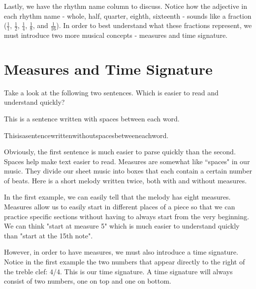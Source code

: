Lastly, we have the rhythm name column to discuss. Notice how the adjective in each rhythm name - whole, half, quarter, eighth, sixteenth - sounds like a fraction ($\frac{1}{1}$, $\frac{1}{2}$, $\frac{1}{4}$, $\frac{1}{8}$, and $\frac{1}{16}$). In order to best understand what these fractions represent, we must introduce two more musical concepts - measures and time signature.

\section{Measures and Time Signature}

Take a look at the following two sentences. Which is easier to read and understand quickly?

\begin{center}
	This is a sentence written with spaces between each word.
	
	Thisisasentencewrittenwithoutspacesbetweeneachword.
\end{center}

Obviously, the first sentence is much easier to parse quickly than the second. Spaces help make text easier to read. Measures are somewhat like ``spaces" in our music. They divide our sheet music into boxes that each contain a certain number of beats. Here is a short melody written twice, both with and without measures. 

\begin{center}
	{\large
	
	
	\vspace{3mm}
	
	\noindent\hrulefill
	
	}
\end{center}

In the first example, we can easily tell that the melody has eight measures. Measures allow us to easily start in different places of a piece so that we can practice specific sections without having to always start from the very beginning. We can think "start at measure 5" which is much easier to understand quickly than "start at the 15th note". 

However, in order to have measures, we must also introduce a time signature. Notice in the first example the two numbers that appear directly to the right of the treble clef: 4/4. This is our time signature. A time signature will always consist of two numbers, one on top and one on bottom. 

